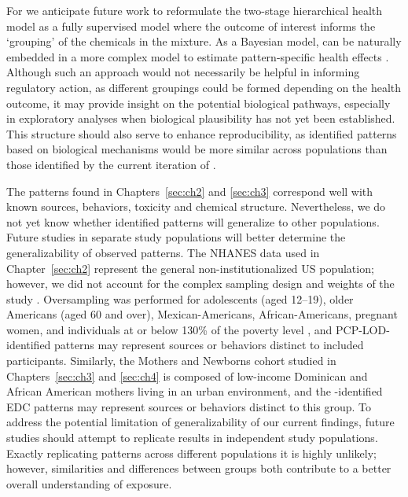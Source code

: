 For \bnmf we anticipate future work to reformulate the two-stage hierarchical health model as a fully supervised model where the outcome of interest informs the `grouping' of the chemicals in the mixture. As a Bayesian model, \bnmf can be naturally embedded in a more complex model to estimate pattern-specific health effects \cite{bda3}. Although such an approach would not necessarily be helpful in informing regulatory action, as different groupings could be formed depending on the health outcome, it may provide insight on the potential biological pathways, especially in exploratory analyses when biological plausibility has not yet been established. This structure should also serve to enhance reproducibility, as identified patterns based on biological mechanisms would be more similar across populations than those identified by the current iteration of \bnmfc.

The patterns found in Chapters~\ref{sec:ch2} and \ref{sec:ch3} correspond well with known sources, behaviors, toxicity and chemical structure. Nevertheless, we do not yet know whether identified patterns will generalize to other populations. Future studies in separate study populations will better determine the generalizability of observed patterns. The NHANES data used in Chapter~\ref{sec:ch2} represent the general non-institutionalized US population; however, we did not account for the complex sampling design and weights of the study \cite{johnson2013national}. Oversampling was performed for adolescents (aged 12–19), older Americans (aged 60 and over), Mexican-Americans, African-Americans, pregnant women, and individuals at or below 130\% of the poverty level \cite{curtin2012national}, and PCP-LOD-identified patterns may represent sources or behaviors distinct to included participants. Similarly, the Mothers and Newborns cohort studied in Chapters~\ref{sec:ch3} and \ref{sec:ch4} is composed of low-income Dominican and African American mothers living in an urban environment, and the \bnmfc-identified EDC patterns may represent sources or behaviors distinct to this group. To address the potential limitation of generalizability of our current findings, future studies should attempt to replicate results in independent study populations. Exactly replicating patterns across different populations it is highly unlikely; however, similarities and differences between groups both contribute to a better overall understanding of exposure.

